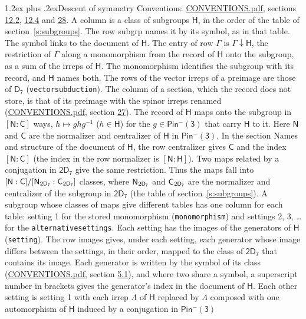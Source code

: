 \documentclass[10pt,a4paper]{article}
\makeatletter
\renewcommand\section{\@startsection{section}{1}{\z@}{-3ex plus -1ex minus -.2ex}%
  {1.2ex plus .2ex}{\normalfont\large\sffamily\bfseries\color{parttitle}}}
\numberwithin{equation}{section}
\newcommand{\grp}[1]{\mathsf{#1}}
\newcommand{\grpindex}[2]{[#1 : #2]}
\newcommand{\restr}[2]{#1\!\downarrow#2}
\newcommand{\hairsp}{\mkern1mu}
\makeatother
\begin{document}
\section{Descent of symmetry}\label{s:subduction}
Conventions: \href{../../CONVENTIONS.pdf}{CONVENTIONS.pdf}, sections \href{../../../rotation/CONVENTIONS.pdf\#conv.12.2}{12.2}, \href{../../../rotation/CONVENTIONS.pdf\#conv.12.4}{12.4} and \href{../../CONVENTIONS.pdf\#conv.28}{28}.
A column is a class of subgroups $\grp{H}$, in the order of the table of section~\ref{s:subgroups}. The row subgrp names it by its symbol, as in that table. The symbol links to the document of $\grp{H}$. The entry of row $\Gamma$ is $\restr{\Gamma}{\grp{H}}$, the restriction of $\Gamma$ along a monomorphism from the record of $\grp{H}$ onto the subgroup, as a sum of the irreps of $\grp{H}$. The monomorphism identifies the subgroup with its record, and $\grp{H}$ names both. The rows of the vector irreps of a preimage are those of \href{../../../rotation/data/pdf/D7.pdf}{$\grp{D_{7}}$} (\texttt{vectorsubduction}). The column of a section, which the record does not store, is that of its preimage with the spinor irreps renamed (\href{../../CONVENTIONS.pdf}{CONVENTIONS.pdf}, section \href{../../CONVENTIONS.pdf\#conv.27}{27}). \label{n:group.normalizer.o3}\label{n:group.centralizer.o3}\label{n:element.h}The record of $\grp{H}$ maps onto the subgroup in $\grpindex{\grp{N}}{\grp{C}}$ ways, $h \mapsto g h g^{-1}$ ($h \in \grp{H}$) for the $g \in \grp{Pin^{-}(3)}$ that carry $\grp{H}$ to it. Here $\grp{N}$ and $\grp{C}$ are the normalizer and centralizer of $\grp{H}$ in \href{Pinminus3.pdf}{$\grp{Pin^{-}(3)}$}. In the section Names and structure of the document of $\grp{H}$, the row centralizer gives $\grp{C}$ and the index $\grpindex{\grp{N}}{\grp{C}}$ (the index in the row normalizer is $\grpindex{\grp{N}}{\grp{H}}$). Two maps related by a conjugation in $\grp{2D_{7}}$ give the same restriction. Thus the maps fall into $\grpindex{\grp{N}}{\grp{C}}/\grpindex{\grp{N}_{\hairsp \grp{2D_{7}}}}{\grp{C}_{\hairsp \grp{2D_{7}}}}$ classes, where $\grp{N}_{\hairsp \grp{2D_{7}}}$ and $\grp{C}_{\hairsp \grp{2D_{7}}}$ are the normalizer and centralizer of the subgroup in $\grp{2D_{7}}$ (the table of section~\ref{s:subgroups}). \label{n:head.setting}A subgroup whose classes of maps give different tables has one column for each table: setting 1 for the stored monomorphism (\texttt{monomorphism}) and settings 2, 3, \dots{} for the \texttt{alternativesettings}. Each setting has the images of the generators of $\grp{H}$ (\texttt{setting}). \label{n:head.images}The row images gives, under each setting, each generator whose image differs between the settings, in their order, mapped to the class of $\grp{2D_{7}}$ that contains its image. Each generator is written by the symbol of its class (\href{../../CONVENTIONS.pdf}{CONVENTIONS.pdf}, section \href{../../../rotation/CONVENTIONS.pdf\#conv.5.1}{5.1}), and where two share a symbol, a superscript number in brackets gives the generator's index in the document of $\grp{H}$. \label{n:irrep.Delta}Each other setting is setting 1 with each irrep $\Lambda$ of $\grp{H}$ replaced by $\Lambda$ composed with one automorphism of $\grp{H}$ induced by a conjugation in \href{Pinminus3.pdf}{$\grp{Pin^{-}(3)}$} 
\end{document}
